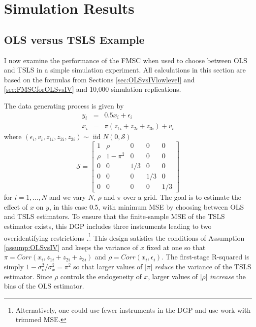 \section{Simulation Results}
\label{sec:simulations}
\subsection{OLS versus TSLS Example}
\label{sec:OLSvsIVsim}
I now examine the performance of the FMSC when used to choose between OLS and TSLS in a simple simulation experiment. 
All calculations in this section are based on the formulas from Sections \ref{sec:OLSvsIVlowlevel} and \ref{sec:FMSCforOLSvsIV} and 10,000 simulation replications. 

The data generating process is given by 
\begin{eqnarray}
	y_i &=& 0.5 x_i + \epsilon_i\\
	\label{eq:OLSvsIVDGP1}
	x_i &=& \pi(z_{1i} + z_{2i} + z_{3i}) + v_i
	\label{eq:OLSvsIVDGP2}
\end{eqnarray}
where $(\epsilon_i, v_i, z_{1i}, z_{2i}, z_{3i}) \sim \mbox{ iid } N(0, \mathcal{S})$
\begin{equation}
	\mathcal{S} = \left[ \begin{array}
		{ccccc} 
		1 & \rho & 0 & 0 & 0\\
		\rho & 1 - \pi^2 & 0 & 0 & 0\\
		0 & 0 & 1/3 & 0 & 0\\
		0 & 0 & 0 & 1/3 & 0 \\
		0 & 0 & 0 & 0 & 1/3
	\end{array}\right]
	\label{eq:OLSvsIVDGP3}
\end{equation}
for $i= 1, \hdots, N$ and we vary $N$, $\rho$ and $\pi$ over a grid.
The goal is to estimate the effect of $x$ on $y$, in this case 0.5, with minimum MSE by choosing between OLS and TSLS estimators.
To ensure that the finite-sample MSE of the TSLS estimator exists, this DGP includes three instruments leading to two overidentifying restrictions \citep{Phillips1980}.\footnote{Alternatively, one could use fewer instruments in the DGP and use work with trimmed MSE.}
This design satisfies the conditions of Assumption \ref{assump:OLSvsIV} and keeps the variance of $x$ fixed at one so that $\pi = Corr(x_i, z_{1i} + z_{2i} + z_{3i})$ and $\rho = Corr(x_i,\epsilon_i)$.
The first-stage R-squared is simply $1 - \sigma_v^2/\sigma_x^2 = \pi^2$ so that larger values of $|\pi|$ \emph{reduce} the variance of the TSLS estimator.
Since $\rho$ controls the endogeneity of $x$, larger values of $|\rho|$ \emph{increase} the bias of the OLS estimator.

